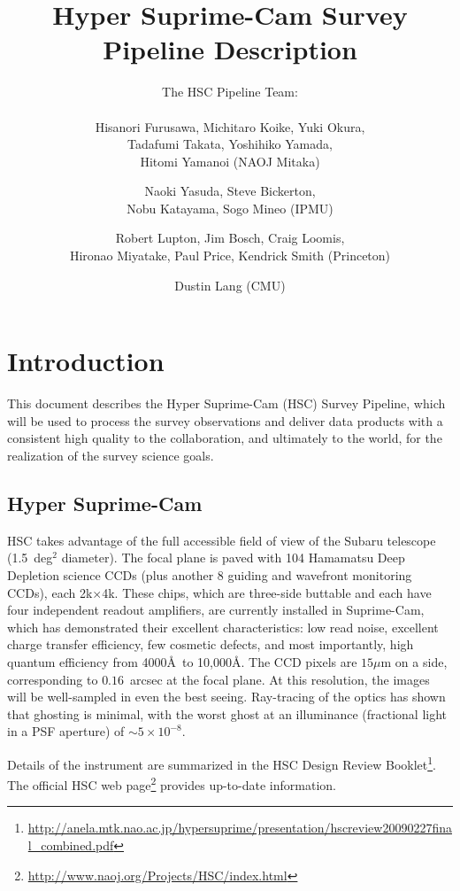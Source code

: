 \documentclass[12pt]{article}
\title{Hyper Suprime-Cam Survey \\
  Pipeline Description}
\author{
  The HSC Pipeline Team: \\ \\
  Hisanori Furusawa,
  Michitaro Koike,
  Yuki Okura, \\
  Tadafumi Takata,
  Yoshihiko Yamada, \\
  Hitomi Yamanoi (NAOJ Mitaka) \and
  Naoki Yasuda,
  Steve Bickerton, \\
  Nobu Katayama,
  Sogo Mineo (IPMU) \and
  Robert Lupton,
  Jim Bosch,
  Craig Loomis, \\
  Hironao Miyatake,
  Paul Price,
  Kendrick Smith (Princeton) \and
  Dustin Lang (CMU) \\
}
\newcommand\x         {\hbox{$\times$}}
\begin{document}
\maketitle
\pagestyle{headings}

\begin{abstract}
\end{abstract}

\clearpage

\tableofcontents

\clearpage

\section{Introduction}

This document describes the Hyper Suprime-Cam (HSC) Survey Pipeline, which will be used to process the survey
observations and deliver data products with a consistent high quality to the collaboration, and ultimately to
the world, for the realization of the survey science goals.

\subsection{Hyper Suprime-Cam}


HSC takes advantage of the full accessible field of view of the Subaru telescope (1.5~deg$^2$
diameter).  The focal plane is paved with 104 Hamamatsu Deep Depletion science CCDs (plus another 8 guiding
and wavefront monitoring CCDs), each 2k\x 4k. These chips, which are three-side buttable and each have four
independent readout amplifiers, are currently installed in Suprime-Cam, which has demonstrated their excellent
characteristics: low read noise, excellent charge transfer efficiency, few cosmetic defects, and most
importantly, high quantum efficiency from 4000\AA\ to 10,000\AA.  The CCD pixels are $15\mu$m on a side,
corresponding to $0.16$~arcsec at the focal plane. At this resolution, the images will be well-sampled in even
the best seeing.  Ray-tracing of the optics has shown that ghosting is minimal, with the worst ghost at an
illuminance (fractional light in a PSF aperture) of $\sim 5 \times 10^{-8}$.

Details of the instrument are summarized in the HSC
Design Review
Booklet\footnote{\url{http://anela.mtk.nao.ac.jp/hypersuprime/presentation/hscreview20090227final_combined.pdf}}. The
official HSC
web page\footnote{\url{http://www.naoj.org/Projects/HSC/index.html}}
provides up-to-date information.
\end{document}
